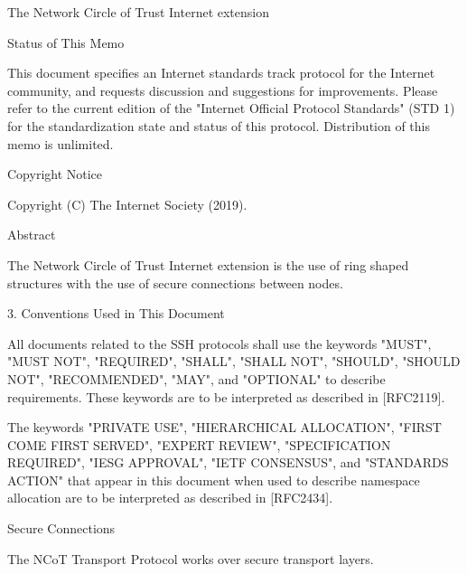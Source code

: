 The Network Circle of Trust Internet extension

Status of This Memo

   This document specifies an Internet standards track protocol for the
   Internet community, and requests discussion and suggestions for
   improvements.  Please refer to the current edition of the "Internet
   Official Protocol Standards" (STD 1) for the standardization state
   and status of this protocol.  Distribution of this memo is unlimited.

Copyright Notice

Copyright (C) The Internet Society (2019).

Abstract

The Network Circle of Trust Internet extension is the use of ring
shaped structures with the use of secure connections between nodes.


3.  Conventions Used in This Document

   All documents related to the SSH protocols shall use the keywords
   "MUST", "MUST NOT", "REQUIRED", "SHALL", "SHALL NOT", "SHOULD",
   "SHOULD NOT", "RECOMMENDED", "MAY", and "OPTIONAL" to describe
   requirements.  These keywords are to be interpreted as described in
   [RFC2119].

   
   The keywords "PRIVATE USE", "HIERARCHICAL ALLOCATION", "FIRST COME
   FIRST SERVED", "EXPERT REVIEW", "SPECIFICATION REQUIRED", "IESG
   APPROVAL", "IETF CONSENSUS", and "STANDARDS ACTION" that appear in
   this document when used to describe namespace allocation are to be
   interpreted as described in [RFC2434].

   Secure Connections

   The NCoT Transport Protocol works over secure transport layers.

   

